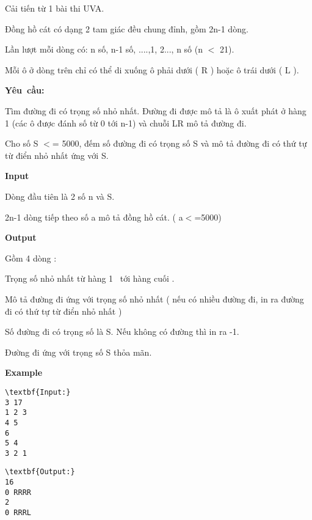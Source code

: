 

Cải tiến từ 1 bài thi UVA.

Đồng hồ cát có dạng 2 tam giác đều chung đỉnh, gồm 2n-1 dòng.

Lần lượt mỗi dòng có: n số, n-1 số, ....,1, 2..., n số (n $<$ 21).

Mỗi ô ở dòng trên chỉ có thể di xuống ô phải dưới ( R ) hoặc ô trái dưới ( L ).

\textbf{Yêu cầu:}

Tìm đường đi có trọng số nhỏ nhất. Đường đi được mô tả là ô xuất phát ở hàng 1 (các ô được đánh số từ 0 tới n-1) và chuỗi LR mô tả đường đi.

Cho số S $<$= 5000, đếm số đường đi có trọng số S và mô tả đường đi có thứ tự từ điển nhỏ nhất ứng với S.

\textbf{Input}

Dòng đầu tiên là 2 số n và S.

2n-1 dòng tiếp theo số a mô tả đồng hồ cát. ( a$<$=5000)

\textbf{Output }

Gồm 4 dòng :

Trọng số nhỏ nhất từ hàng 1  tới hàng cuối .

Mô tả đường đi ứng với trọng số nhỏ nhất ( nếu có nhiều đường đi, in ra đường đi có thứ tự từ điển nhỏ nhất )

Số đường đi có trọng số là S. Nếu không có đường thì in ra -1.

Đường đi ứng với trọng số S thỏa mãn.

\textbf{Example}
\begin{verbatim}
\textbf{Input:}
3 17
1 2 3
4 5
6
5 4
3 2 1\end{verbatim}
\begin{verbatim}
\textbf{Output:}
16
0 RRRR
2
0 RRRL\end{verbatim}